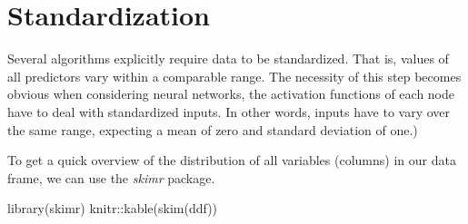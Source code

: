 \documentclass[
]{book}
\newenvironment{Shaded}{\begin{snugshade}}{\end{snugshade}}
\newcommand{\FunctionTok}[1]{\textcolor[rgb]{0.00,0.00,0.00}{#1}}
\newcommand{\NormalTok}[1]{#1}
\newcommand{\SpecialCharTok}[1]{\textcolor[rgb]{0.00,0.00,0.00}{#1}}
\begin{document}
\hypertarget{standardization}{%
\section{Standardization}\label{standardization}}

Several algorithms explicitly require data to be standardized. That is, values of all predictors vary within a comparable range. The necessity of this step becomes obvious when considering neural networks, the activation functions of each node have to deal with standardized inputs. In other words, inputs have to vary over the same range, expecting a mean of zero and standard deviation of one.)

To get a quick overview of the distribution of all variables (columns) in our data frame, we can use the \emph{skimr} package.

\begin{Shaded}
\begin{Highlighting}[]
\FunctionTok{library}\NormalTok{(skimr)}
\NormalTok{knitr}\SpecialCharTok{::}\FunctionTok{kable}\NormalTok{(}\FunctionTok{skim}\NormalTok{(ddf))}
\end{Highlighting}
\end{Shaded}
\end{document}

